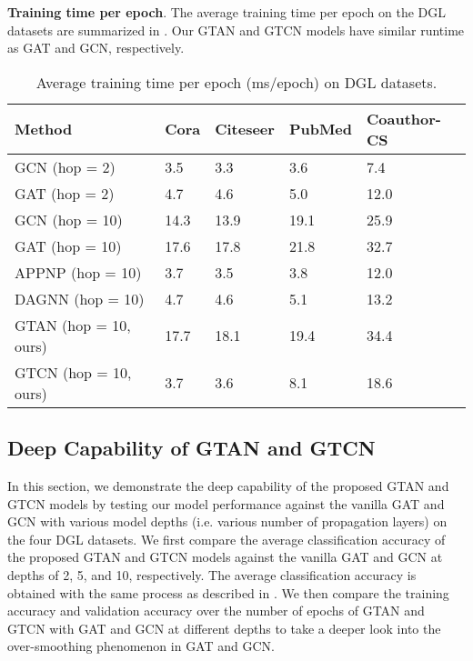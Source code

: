 \documentclass[lettersize,journal]{IEEEtran}
\theoremstyle{plain}
\theoremstyle{definition}
\theoremstyle{remark}
\begin{document}
\textbf{Training time per epoch}. The average training time per epoch on the DGL datasets are summarized in . Our GTAN and GTCN models have similar runtime as GAT and GCN, respectively.

\begin{table*}[t]
	\caption{Average training time per epoch (ms/epoch) on DGL datasets.}
	\label{tb:time}
	\begin{center}
			\begin{tabular}{lllll}
				\toprule
				\textbf{Method} &\textbf{Cora} &\textbf{Citeseer} &\textbf{PubMed} &\textbf{Coauthor-CS} \\
				\midrule
				GCN (hop = 2) &3.5  &3.3  &3.6   &7.4\\
				GAT (hop = 2) &4.7  &4.6  &5.0  &12.0\\
				GCN (hop = 10) &14.3  &13.9  &19.1   &25.9\\
				GAT (hop = 10) &17.6  &17.8  &21.8  &32.7\\
				APPNP (hop = 10) &3.7  &3.5  &3.8  &12.0\\
				DAGNN (hop = 10) &4.7  &4.6  &5.1  &13.2\\
				\midrule
				GTAN (hop = 10, ours) &17.7  &18.1  &19.4  &34.4\\
				GTCN (hop = 10, ours) &3.7  &3.6  &8.1  &18.6\\
				\bottomrule
			\end{tabular}
	\end{center}
\end{table*}

\subsection{Deep Capability of GTAN and GTCN}
\label{exp_depth}

In this section, we demonstrate the deep capability of the proposed GTAN and GTCN models by testing our model performance against the vanilla GAT and GCN with various model depths (i.e. various number of propagation layers) on the four DGL datasets. We first compare the average classification accuracy of the proposed GTAN and GTCN models against the vanilla GAT and GCN at depths of 2, 5, and 10, respectively. The average classification accuracy is obtained with the same process as described in . We then compare the training accuracy and validation accuracy over the number of epochs of GTAN and GTCN with GAT and GCN at different depths to take a deeper look into the over-smoothing phenomenon in GAT and GCN.
\end{document}
